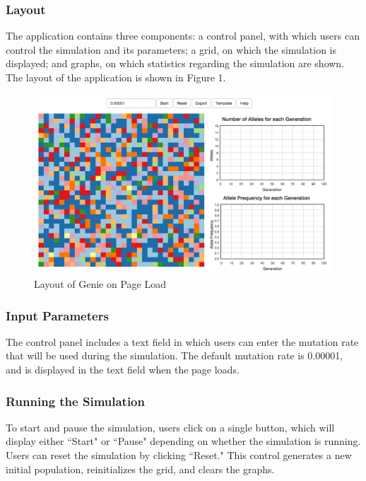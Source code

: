 \documentclass[12pt]{article}
\begin{document}
\begin{spacing}{1.6}
\subsubsection{Layout}
The application contains three components: a control panel, with which users can control the simulation and its parameters; a grid, on which the simulation is displayed; and graphs, on which statistics regarding the simulation are shown. The layout of the application is shown in Figure 1.
\begin{figure}[h]
\caption{Layout of Genie on Page Load}
\centering
\includegraphics[scale=0.4]{layout}
\end{figure}

\subsubsection{Input Parameters}
The control panel includes a text field in which users can enter the mutation rate that will be used during the simulation. The default mutation rate is 0.00001, and is displayed in the text field when the page loads.

\subsubsection{Running the Simulation}
To start and pause the simulation, users click on a single button, which will display either ``Start" or ``Pause" depending on whether the simulation is running. Users can reset the simulation by clicking ``Reset." This control generates a new initial population, reinitializes the grid, and clears the graphs.


\end{spacing}
\end{document}
